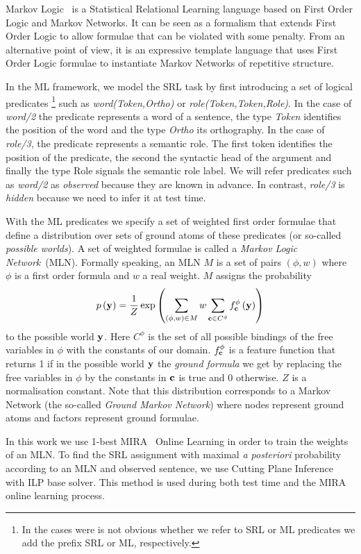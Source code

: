 Markov Logic~\citep[ML,][]{richardson06mln} is a Statistical Relational Learning 
language based on First Order Logic and Markov Networks. It can be seen as a 
formalism that extends First Order Logic to allow formulae that can be violated 
with some penalty. From an alternative point of view, it is an expressive 
template language that uses First Order Logic formulae to instantiate
Markov Networks of repetitive structure. 

In the ML framework,  we model the SRL task by first introducing a set of 
logical predicates \footnote{In the cases were is not obvious whether we refer 
to SRL or ML predicates we add the prefix SRL or ML, respectively.} such as 
\emph{word(Token,Ortho)} or \emph{role(Token,Token,Role)}. In the case of 
\emph{word/2} the predicate represents a word of a sentence, the type 
\emph{Token} identifies the position of the word and the type \emph{Ortho} its 
orthography. In the case of \emph{role/3}, the predicate represents a semantic 
role. The first token identifies the position of the predicate, the second the 
syntactic head of the argument and finally the type Role signals the semantic 
role label. We will refer predicates such as \emph{word/2} as \emph{observed} 
because they are known in advance. In contrast, \emph{role/3} is \emph{hidden} 
because we need to infer it at test time.

With the ML predicates we specify a set of weighted first order formulae that 
define a distribution over sets of ground atoms of these predicates (or 
so-called \emph{possible worlds}). A set of weighted formulae is called a 
\emph{Markov Logic Network}~(MLN). Formally speaking, an MLN $M$ is a set of 
pairs $\left(\phi,w\right)$ where $\phi$ is a first order formula and $w$ a real 
weight. $M$ assigns the probability
\begin{equation}
p\left(\mathbf{y}\right)=\frac{1}{Z}\exp\left(
\sum_{\left(\phi,w\right)\in M} w
\sum_{\mathbf{c}\in C^{\phi}}f_{\mathbf{c}}^{\phi}\left(\mathbf{y}\right)
\right)
\label{eq:prob}
\end{equation}
to the possible world $\mathbf{y}$.  Here $C^{\phi}$ is the set of all possible
bindings of the free variables in $\phi$ with the constants of our
domain. $f_{\mathbf{c}}^{\phi}$ is a feature function that returns 1
if in the possible world $\mathbf{y}$ the \emph{ground formula} we get by
replacing the free variables in $\phi$ by the constants in $\mathbf{c}$
is true and 0 otherwise. $Z$ is a normalisation constant. Note that
this distribution corresponds to a Markov Network (the so-called \emph{Ground
Markov Network}) where nodes represent ground atoms and factors represent
ground formulae.

In this work we use 1-best 
MIRA~\citep{crammer01ultraconservative} Online Learning in order to train the weights of an MLN.  To find the SRL assignment with maximal \emph{a posteriori} probability according to an MLN and observed sentence, we use Cutting Plane 
Inference~\citep[CPI,][]{riedel08improving} with ILP base solver. This method is 
used during both test time and the MIRA online learning process.

